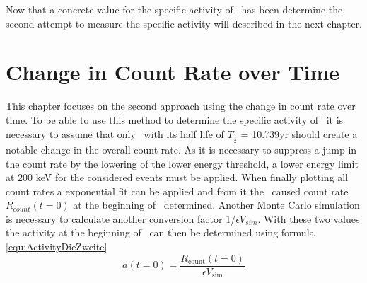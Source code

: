 \documentclass[encoding=utf8,british]{tumphthesis}
\begin{document}
Now that a concrete value for the specific activity of \Kr\ has been determine the second attempt to measure the specific activity will described in the next chapter.
\\  
\fi







\chapter{Change in Count Rate over Time}
\label{sec:SAfromDecrease}

This chapter focuses on the second approach using the change in count rate over time.
To be able to use this method to determine the specific activity of \Kr\ it is necessary to assume that only \Kr\ with its half life of $T_{\frac{1}{2}}$ = 10.739\unit{yr} should create a notable change in the overall count rate.
As it is necessary to suppress a jump in the count rate by the lowering of the lower energy threshold, a lower energy limit at 200 keV for the considered events must be applied.
When finally plotting all count rates a exponential fit can be applied and from it the \Kr\ caused count rate $R_{count}(t=0)$ at the beginning of \PII\ determined.
Another Monte Carlo simulation is necessary to calculate another conversion factor 1/$\epsilon V_{sim}$.
With these two values the activity at the beginning of \PII\ can then be determined using formula \ref{equ:ActivityDieZweite}
\begin{equation}
a(t=0) = \frac{R_{\mathrm{count}}(t=0)}{\epsilon V_{\mathrm{sim}}}
\label{equ:ActivityDieZweite}
\end{equation}
\\
\end{document}
